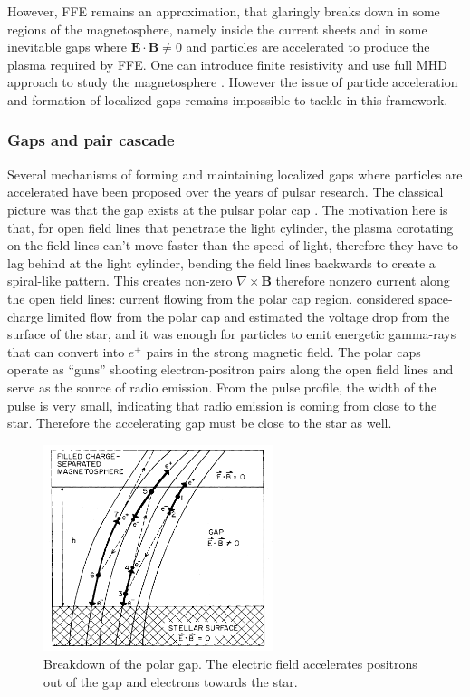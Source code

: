 
However, FFE remains an approximation, that glaringly breaks down in some
regions of the magnetosphere, namely inside the current sheets and in some
inevitable gaps where $\mathbf{E}\cdot \mathbf{B} \neq 0$ and particles are
accelerated to produce the plasma required by FFE. One can introduce finite
resistivity and use full MHD approach to study the magnetosphere %
. However the issue of particle acceleration and formation of localized gaps
remains impossible to tackle in this framework.

\subsubsection{Gaps and pair cascade}
\label{sec:gap-models}

Several mechanisms of forming and maintaining localized gaps where particles are
accelerated have been proposed over the years of pulsar research. The classical
picture was that the gap exists at the pulsar polar cap
\citep{sturrock_model_1971}. The motivation here is that, for open field lines
that penetrate the light cylinder, the plasma corotating on the field lines
can't move faster than the speed of light, therefore they have to lag behind at
the light cylinder, bending the field lines backwards to create a spiral-like
pattern. This creates non-zero $\nabla\times \mathbf{B}$ therefore nonzero
current along the open field lines: current flowing from the polar cap region.
\citet{sturrock_model_1971} considered space-charge limited flow
\citep{pierce_theory_1954} from the polar cap and estimated the voltage drop
from the surface of the star, and it was enough for particles to emit energetic
gamma-rays that can convert into $e^{\pm}$ pairs in the strong magnetic field.
The polar caps operate as ``guns'' shooting electron-positron pairs along the
open field lines and serve as the source of radio emission. From the pulse
profile, the width of the pulse is very small, indicating that radio emission is
coming from close to the star. Therefore the accelerating gap must be close to
the star as well.

\begin{figure}[h]
  \centering
  \includegraphics[width=0.6\textwidth]{pics/intro/ruderman-sutherland.png}
  \caption[Breakdown of the polar gap.]{Breakdown of the polar gap. The electric
    field accelerates positrons out of the gap and electrons towards the star.}
  \label{fig:ruderman-gap-pic}
\end{figure}

